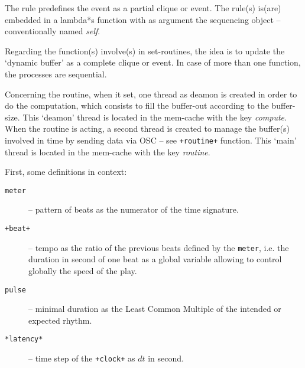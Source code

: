 \smallskip

The rule predefines the event as a partial clique or event. The rule(s) is(are) embedded in a \glspl{lambda*} function with as argument the sequencing object -- conventionally named \textit{self}.

\smallskip
 
Regarding the function(s) involve(s) in \glspl{set-routine}, the idea is to update the `dynamic buffer' as a complete clique or event. In case of more than one function, the processes are sequential. 

\smallskip

Concerning the routine, when it set, one thread as deamon is created in order to do the computation, which consists to fill the buffer-out according to the buffer-size. This `deamon' thread is located in the mem-cache with the key \textsl{compute}. When the routine is acting, a second thread is created to manage the buffer(s) involved in time by sending data via OSC -- see \texttt{+routine+} function. This `main' thread is located in the mem-cache with the key \textsl{routine}.

\bigskip
\bigskip

{}

\bigskip

First, some definitions in context:
\begin{description}
\item[\texttt{meter}] -- pattern of beats as the numerator of the time signature.
\item[\texttt{+beat+}] -- tempo as the ratio of the previous beats defined by the \texttt{meter}, i.e. the duration in second of one beat as a global variable allowing to control globally the speed of the play.
\item[\texttt{pulse}] -- minimal duration as the Least Common Multiple of the intended or expected rhythm.
\item[\texttt{*latency*}] -- time step of the \texttt{+clock+} as $dt$ in second.
\end{description}
   
%   
%
%

